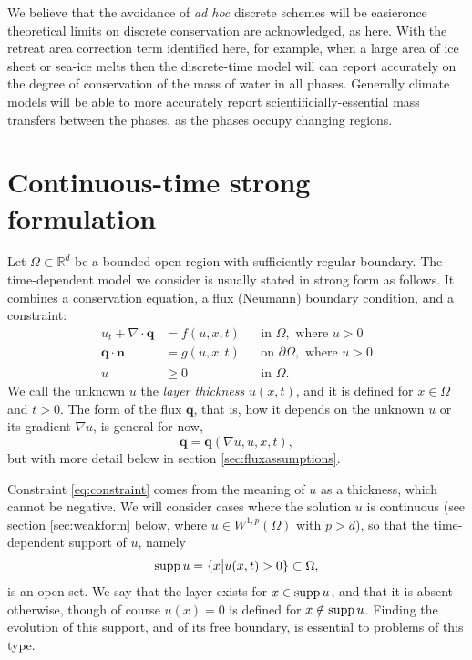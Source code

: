 \documentclass[final,leqno,onefignum,onetabnum]{siamltex1213bueler}
\newcommand\bn{\mathbf{n}}
\newcommand\bq{\mathbf{q}}
\newcommand{\Div}{\nabla\cdot}
\renewcommand{\grad}{\nabla}
\newcommand\RR{\mathbb{R}}
\begin{document}
We believe that the avoidance of \emph{ad hoc} discrete schemes will be easieronce theoretical limits on discrete conservation are acknowledged, as here.  With the retreat area correction term identified here, for example, when a large area of ice sheet or sea-ice melts then the discrete-time model will can report accurately on the degree of conservation of the mass of water in all phases.  Generally climate models will be able to more accurately report scientificially-essential mass transfers between the phases, as the phases occupy changing regions.


\section{Continuous-time strong formulation}  \label{sec:strongform}

Let $\Omega \subset \RR^d$ be a bounded open region with sufficiently-regular boundary.  The time-dependent model we consider is usually stated in strong form as follows.  It combines a conservation equation, a flux (Neumann) boundary condition, and a constraint:
\begin{align}
u_t + \Div \bq &= f(u,x,t) &&\text{in } \Omega, \text{ where } u > 0 \label{eq:massconserve} \\
\bq \cdot \bn &= g(u,x,t) &&\text{on } \partial\Omega, \text{ where } u > 0 \label{eq:fixedneumann} \\
u &\ge 0 &&\text{in } \bar\Omega. \label{eq:constraint}
\end{align}
We call the unknown $u$ the \emph{layer thickness} $u(x,t)$, and it is defined for $x\in \Omega$ and $t>0$.  The form of the flux $\bq$, that is, how it depends on the unknown $u$ or its gradient $\grad u$, is general for now,
\begin{equation}
\bq = \bq(\grad u,u,x,t), \label{eq:fluxdepends}
\end{equation}
but with more detail below in section \ref{sec:fluxassumptions}.

Constraint \eqref{eq:constraint} comes from the meaning of $u$ as a thickness, which cannot be negative.  We will consider cases where the solution $u$ is continuous (see section \ref{sec:weakform} below, where $u\in W^{1,p}(\Omega)$ with $p>d$), so that the time-dependent support of $u$, namely
   $$\supp u = \{x \big| u(x,t) > 0\} \subset \Omega,$$
is an open set.  We say that the layer exists for $x\in \supp u$, and that it is absent otherwise, though of course $u(x)=0$ is defined for $x\notin \supp u$.  Finding the evolution of this support, and of its free boundary, is essential to problems of this type.
\end{document}
